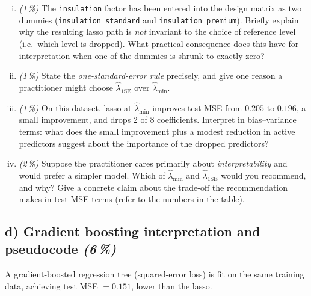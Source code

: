 \documentclass[11pt,a4paper]{article}
\newcommand{\subpoints}[1]{\textit{(#1\,\%)}}
\begin{document}
\begin{enumerate}[(i)]
  \item \subpoints{1} The \texttt{insulation} factor has been entered into the design matrix as two dummies (\texttt{insulation\_standard} and \texttt{insulation\_premium}). Briefly explain why the resulting lasso path is \emph{not} invariant to the choice of reference level (i.e.\ which level is dropped). What practical consequence does this have for interpretation when one of the dummies is shrunk to exactly zero?
  \item \subpoints{1} State the \emph{one-standard-error rule} precisely, and give one reason a practitioner might choose $\hat\lambda_{1\mathrm{SE}}$ over $\hat\lambda_{\min}$.
  \item \subpoints{1} On this dataset, lasso at $\hat\lambda_{\min}$ improves test MSE from $0.205$ to $0.196$, a small improvement, and drops 2 of 8 coefficients. Interpret in bias--variance terms: what does the small improvement plus a modest reduction in active predictors suggest about the importance of the dropped predictors?
  \item \subpoints{2} Suppose the practitioner cares primarily about \emph{interpretability} and would prefer a simpler model. Which of $\hat\lambda_{\min}$ and $\hat\lambda_{1\mathrm{SE}}$ would you recommend, and why? Give a concrete claim about the trade-off the recommendation makes in test MSE terms (refer to the numbers in the table).
\end{enumerate}

\subsection*{d) Gradient boosting interpretation and pseudocode \subpoints{6}}

A gradient-boosted regression tree (squared-error loss) is fit on the same training data, achieving test MSE $= 0.151$, lower than the lasso.
\end{document}
